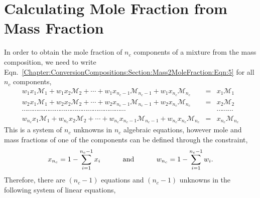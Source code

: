 \section{Calculating Mole Fraction from Mass Fraction}\label{Chapter:ConversionCompositions:Section:Mole2MassFraction}
In order to obtain the mole fraction of $n_{c}$ components of a mixture from the mass composition, we need to write Eqn.~\ref{Chapter:ConversionCompositions:Section:Mass2MoleFraction:Eqn:5} for all $n_{c}$ components,
  \begin{eqnarray}
    w_{1}x_{1}\mathcal{M}_{1} + w_{1}x_{2}\mathcal{M}_{2} + \cdots + w_{1}x_{n_{c}-1}\mathcal{M}_{n_{c}-1} + w_{1}x_{n_{c}}\mathcal{M}_{n_{c}}  &=& x_{1}\mathcal{M}_{1} \nonumber \\
    w_{2}x_{1}\mathcal{M}_{1} + w_{2}x_{2}\mathcal{M}_{2} + \cdots + w_{2}x_{n_{c}-1}\mathcal{M}_{n_{c}-1} + w_{2}x_{n_{c}}\mathcal{M}_{n_{c}}  &=& x_{2}\mathcal{M}_{2} \nonumber \\
   \cdots\cdots\cdots\cdots\cdots\cdots\cdots\cdots\cdots\cdots\cdots\cdots\cdots\cdots\cdots\cdots\cdots\cdots\cdots && \cdots\cdots\cdots\nonumber \\
    w_{n_{c}}x_{1}\mathcal{M}_{1} + w_{n_{c}}x_{2}\mathcal{M}_{2} + \cdots + w_{n_{c}}x_{n_{c}-1}\mathcal{M}_{n_{c}-1} + w_{n_{c}}x_{n_{c}}\mathcal{M}_{n_{c}}  &=& x_{n_{c}}\mathcal{M}_{n_{c}} \nonumber
  \end{eqnarray}
This is a system of $n_{c}$ unknowns in $n_{c}$ algebraic equations, however mole and mass fractions of one of the components can be defined through the constraint,
  \begin{equation}
     x_{n_{c}} = 1 - \sum\limits_{i=1}^{n_{c}-1}x_{i}\hspace{1cm}\text{ and }\hspace{1cm}w_{n_{c}} = 1 - \sum\limits_{i=1}^{n_{c}-1}w_{i}.
  \end{equation}
Therefore, there are $\left(n_{c}-1\right)$ equations and $\left(n_{c}-1\right)$ unknowns in the following system of linear equations,

